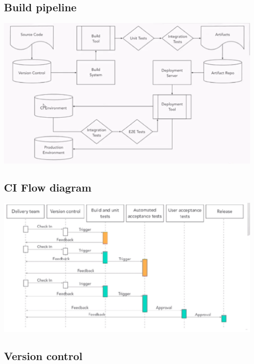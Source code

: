 \documentclass[a4paper,14pt, twocolumn]{extarticle}
\begin{document}
	\subsection{Build pipeline}
		\begin{center}
			\includegraphics[width=16cm]{bpl}
		\end{center}
	\subsection{CI Flow diagram}
		\begin{center}
			\includegraphics[width=16cm]{fd}
		\end{center}
	\twocolumn
	\subsection{Version control}
\end{document}
